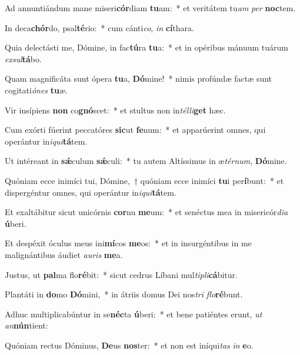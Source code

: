 \item Ad annuntiándum mane miseri\textbf{cór}diam \textbf{tu}am:~* et veritátem tu\textit{am} \textit{per} \textbf{noc}tem.
\item In deca\textbf{chór}do, psal\textbf{té}rio:~* cum cánti\textit{co}, \textit{in} \textbf{cí}thara.
\item Quia delectásti me, Dómine, in fac\textbf{tú}ra \textbf{tu}a:~* et in opéribus mánuum tuárum \textit{ex}\textit{sul}\textbf{tá}bo.
\item Quam magnificáta sunt ópera \textbf{tu}a, \textbf{Dó}mine!~* nimis profúndæ factæ sunt cogitati\textit{ó}\textit{nes} \textbf{tu}æ.
\item Vir insípiens \textbf{non} co\textbf{gnó}scet:~* et stultus non in\textit{tél}\textit{li}\textbf{get} hæc.
\item Cum exórti fúerint peccatóres \textbf{sic}ut \textbf{fe}num:~* et apparúerint omnes, qui operántur in\textit{i}\textit{qui}\textbf{tá}tem.
\item Ut intéreant in \textbf{sǽ}culum \textbf{sǽ}culi:~* tu autem Altíssimus in æ\textit{tér}\textit{num}, \textbf{Dó}mine.
\item Quóniam ecce inimíci tui, Dómine,~† quóniam ecce inimíci \textbf{tu}i per\textbf{í}bunt:~* et dispergéntur omnes, qui operántur in\textit{i}\textit{qui}\textbf{tá}tem.
\item Et exaltábitur sicut unicórnis \textbf{cor}nu \textbf{me}um:~* et senéctus mea in misericór\textit{di}\textit{a} \textbf{ú}beri.
\item Et despéxit óculus meus ini\textbf{mí}cos \textbf{me}os:~* et in insurgéntibus in me malignántibus áudiet \textit{au}\textit{ris} \textbf{me}a.
\item Justus, ut \textbf{pal}ma flo\textbf{ré}bit:~* sicut cedrus Líbani mul\textit{ti}\textit{pli}\textbf{cá}bitur.
\item Plantáti in \textbf{do}mo \textbf{Dó}mini,~* in átriis domus Dei nos\textit{tri} \textit{flo}\textbf{ré}bunt.
\item Adhuc multiplicabúntur in se\textbf{néc}ta \textbf{ú}beri:~* et bene patiéntes erunt, \textit{ut} \textit{an}\textbf{nún}tient:
\item Quóniam rectus Dóminus, \textbf{De}us \textbf{nos}ter:~* et non est iníqui\textit{tas} \textit{in} \textbf{e}o.

